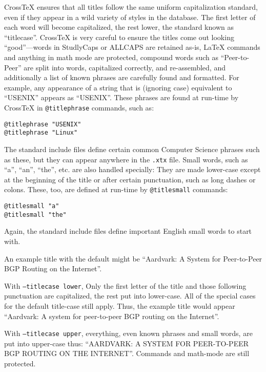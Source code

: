 \documentclass{article}
\newcommand{\XTX}{Cross\TeX}
\begin{document}
\XTX{} ensures that all titles follow the same uniform capitalization
standard, even if they appear in a wild variety of styles in the database.
The first letter of each word will become capitalized, the rest lower,
the standard known as ``titlecase''.  \XTX{} is very careful to ensure
the titles come out looking ``good''---words in StudlyCaps or ALLCAPS are
retained as-is, \LaTeX{} commands and anything in math mode are protected,
compound words such as ``Peer-to-Peer'' are split into words, capitalized
correctly, and re-assembled, and additionally a list of known phrases are
carefully found and formatted.  For example, any appearance of a string
that is (ignoring case) equivalent to ``USENIX'' appears as ``USENIX''.
These phrases are found at run-time by \XTX{} in \texttt{@titlephrase}
commands, such as:

\begin{small}\begin{verbatim}
@titlephrase "USENIX"
@titlephrase "Linux"
\end{verbatim}\end{small}

The standard include files define certain common Computer Science phrases
such as these, but they can appear anywhere in the \texttt{.xtx} file.
Small words, such as ``a'', ``an'', ``the'', etc. are also handled
specially: They are made lower-case except at the beginning of the title
or after certain punctuation, such as long dashes or colons.  These,
too, are defined at run-time by \texttt{@titlesmall} commands:

\begin{small}\begin{verbatim}
@titlesmall "a"
@titlesmall "the"
\end{verbatim}\end{small}

Again, the standard include files define important English small words
to start with.

An example title with the default might be ``Aardvark: A System for
Peer-to-Peer BGP Routing on the Internet''.

With \texttt{--titlecase lower}, Only the first letter of the title and
those following punctuation are capitalized, the rest put into lower-case.
All of the special cases for the default title-case still apply.  Thus,
the example title would appear ``Aardvark: A system for peer-to-peer
BGP routing on the Internet''.

With \texttt{--titlecase upper}, everything, even known phrases and
small words, are put into upper-case thus: ``AARDVARK: A SYSTEM FOR
PEER-TO-PEER BGP ROUTING ON THE INTERNET''.  Commands and math-mode are
still protected.
\end{document}
